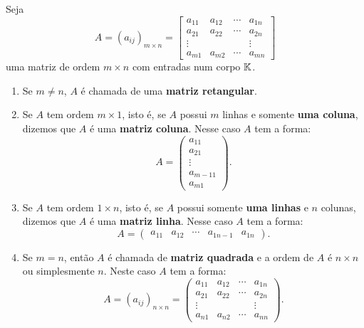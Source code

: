 \begin{definicao}
	Seja
	\[
		A = (a_{ij})_{m\times n} = \begin{bmatrix}
			a_{11} & a_{12} & \cdots & a_{1n}\\
			a_{21} & a_{22} & \cdots & a_{2n}\\
			\vdots & & & \vdots\\
			a_{m1} & a_{m2} & \cdots & a_{mn}
		\end{bmatrix}
	\]
	uma matriz de ordem $m \times n$ com entradas num corpo $\mathbb{K}$.

	\begin{enumerate}
		\item Se $m \ne n$, $A$ é chamada de uma \textbf{matriz retangular}.

		\item Se $A$ tem ordem $m \times 1$, isto é, se $A$ possui $m$ linhas e somente \textbf{uma coluna}, dizemos que $A$ é uma \textbf{matriz coluna}. Nesse caso $A$ tem a forma:
		\[
			A = \begin{pmatrix}a_{11}\\a_{21}\\\vdots\\a_{m - 11}\\a_{m1}\end{pmatrix}.
		\]
		\item Se $A$ tem ordem $1 \times n$, isto é, se $A$ possui somente \textbf{uma linhas} e $n$ colunas, dizemos que $A$ é uma \textbf{matriz linha}. Nesse caso $A$ tem a forma:
		\[
			A = \begin{pmatrix}a_{11} & a_{12} & \cdots & a_{1n-1} & a_{1n}\end{pmatrix}.
		\]
		\item Se $m = n$, então $A$ é chamada de \textbf{matriz quadrada} e a ordem de $A$ é $n \times n$ ou simplesmente $n$. Neste caso $A$ tem a forma:
		\[
			A = (a_{ij})_{n\times n} = \begin{pmatrix}
				a_{11} & a_{12} & \cdots & a_{1n}\\
				a_{21} & a_{22} & \cdots & a_{2n}\\
				\vdots & & & \vdots\\
				a_{n1} & a_{n2} & \cdots & a_{nn}
			\end{pmatrix}.
		\]

	\end{enumerate}
\end{definicao}

